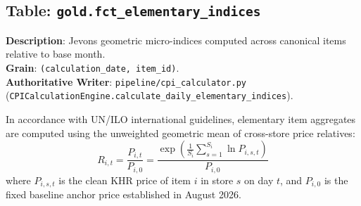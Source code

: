 \documentclass[a4paper, 11pt]{article}
\begin{document}
\newpage
\subsection{Table: \texttt{gold.fct\_elementary\_indices}}
\textbf{Description}: Jevons geometric micro-indices computed across canonical items relative to base month. \\
\textbf{Grain}: \texttt{(calculation\_date, item\_id)}. \\
\textbf{Authoritative Writer}: \texttt{pipeline/cpi\_calculator.py} (\texttt{CPICalculationEngine.calculate\_daily\_elementary\_indices}).

\begin{tcolorbox}[title=The Jevons Axiomatic Micro-Index Formula]
In accordance with UN/ILO international guidelines, elementary item aggregates are computed using the unweighted geometric mean of cross-store price relatives:
\begin{equation}
R_{i, t} = \frac{P_{i, t}}{P_{i, 0}} = \frac{\exp\left( \frac{1}{S_i} \sum_{s=1}^{S_i} \ln P_{i, s, t} \right)}{P_{i, 0}}
\end{equation}
where $P_{i, s, t}$ is the clean KHR price of item $i$ in store $s$ on day $t$, and $P_{i, 0}$ is the fixed baseline anchor price established in August 2026.
\end{tcolorbox}
\end{document}
